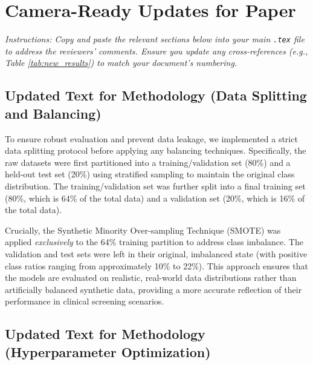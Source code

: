 \documentclass{article}
\begin{document}
\section*{Camera-Ready Updates for Paper}

\textit{Instructions: Copy and paste the relevant sections below into your main \texttt{.tex} file to address the reviewers' comments. Ensure you update any cross-references (e.g., Table \ref{tab:new_results}) to match your document's numbering.}

\subsection*{Updated Text for Methodology (Data Splitting and Balancing)}

To ensure robust evaluation and prevent data leakage, we implemented a strict data splitting protocol before applying any balancing techniques. Specifically, the raw datasets were first partitioned into a training/validation set (80\%) and a held-out test set (20\%) using stratified sampling to maintain the original class distribution. The training/validation set was further split into a final training set (80\%, which is 64\% of the total data) and a validation set (20\%, which is 16\% of the total data). 

Crucially, the Synthetic Minority Over-sampling Technique (SMOTE) was applied \textit{exclusively} to the 64\% training partition to address class imbalance. The validation and test sets were left in their original, imbalanced state (with positive class ratios ranging from approximately 10\% to 22\%). This approach ensures that the models are evaluated on realistic, real-world data distributions rather than artificially balanced synthetic data, providing a more accurate reflection of their performance in clinical screening scenarios.


\subsection*{Updated Text for Methodology (Hyperparameter Optimization)}
\end{document}
